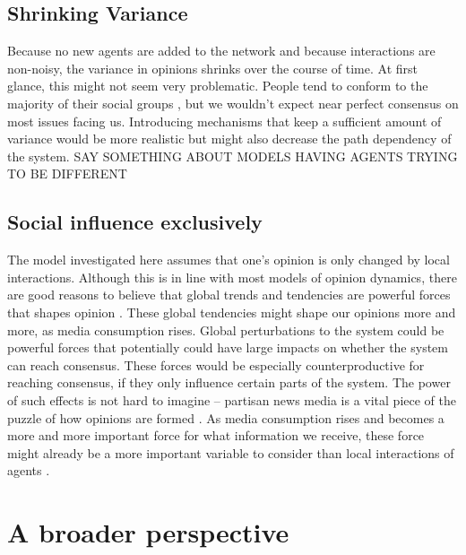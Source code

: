 \documentclass{article}
\begin{document}
\subsection{Shrinking Variance}

Because no new agents are added to the network and because interactions are non-noisy, the variance in opinions shrinks over the course of time. At first glance, this might not seem very problematic. People tend to conform to the majority of their social groups \cite{mcpherson_birds_2001}, but we wouldn’t expect near perfect consensus on most issues facing us. Introducing mechanisms that keep a sufficient amount of variance would be more realistic but might also decrease the path dependency of the system. 
SAY SOMETHING ABOUT MODELS HAVING AGENTS TRYING TO BE DIFFERENT 

\subsection{Social influence exclusively}

The model investigated here assumes that one’s opinion is only changed by local interactions. Although this is in line with most models of opinion dynamics, there are good reasons to believe that global trends and tendencies are powerful forces that shapes opinion \cite{bener_empirical_2016}. These global tendencies might shape our opinions more and more, as media consumption rises. Global perturbations to the system could be powerful forces that potentially could have large impacts on whether the system can reach consensus. These forces would be especially counterproductive for reaching consensus, if they only influence certain parts of the system. The power of such effects is not hard to imagine – partisan news media is a vital piece of the puzzle of how opinions are formed \cite{pennycook_lazy_2019}. As media consumption rises and becomes a more and more important force for what information we receive, these force might already be a more important variable to consider than local interactions of agents \cite{bener_empirical_2016,stromback_dynamics_2013}. 
\section{A broader perspective}
\end{document}
